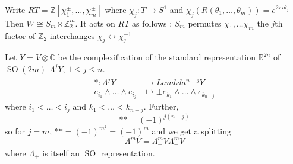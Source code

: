\documentclass[11pt,a4paper]{scrarticle}
\theoremstyle{definition}
\theoremstyle{greenbox}
\newcommand{\R}{\mathbb{R}}
\newcommand{\Z}{\mathbb{Z}}
\newcommand{\C}{\mathbb{C}}
\begin{document}
\begin{example}
     Write $ RT = \Z[\chi_{1}^{\pm}, \dots, \chi_{m}^{\pm}] $ where $ \chi_{j}: T \to S^{1} $ and $ \chi_{j}(R(\theta_{1}, \dots, \theta_{m})) = e^{2 \pi i \theta_{j}} $
     Then $ W \cong S_{m} \ltimes \Z_{2}^{m} $. It acts on $ RT $ as follows : $ S_{m}$  permutes $ \chi_{1}, \dots \chi_{m} $ the $ j $th factor of $ \Z_{2} $ interchanges $ \chi_{j} \longleftrightarrow \chi_{j}^{-1} $
\end{example}
Let $ Y = V \otimes \C $ be the complexification of the standard representation $ \R^{2n} $ of $ \operatorname{SO}(2m) $ $ \Lambda^{j} Y $, $ 1 \le j \le n $. \begin{align*}
    * : \Lambda^{j} Y & \to Lambda^{n-j}Y \\
    e_{i_{1}} \wedge \dots \wedge e_{i_{j}} & \mapsto \pm e_{k_{1}} \wedge \dots \wedge e_{k_{n-j}}
\end{align*}
where $ i_{1}< \dots < i_{j} $ and $ k_{1} < \dots < k_{n-j} $. Further, 
\[ ** = (-1)^{j(n-j)} \]
so for $ j=m $, $ ** = (-1)^{m^{2}} = (-1)^{m} $ and we get a splitting 
\[ \Lambda^{m}V = \Lambda_{+}^{m}V \Lambda_{-}^{m}V \]
where $ \Lambda_{+} $ is itself an $ \operatorname{SO} $ representation. 
\end{document}
